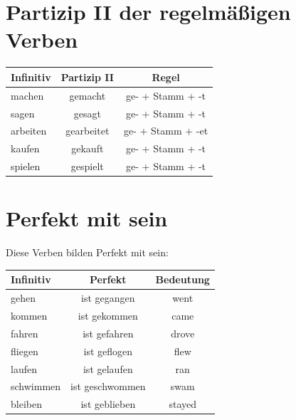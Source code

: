 \section{Partizip II der regelmäßigen Verben}

\begin{center}
\begin{tabular}{|l|c|c|}
\hline
Infinitiv & Partizip II & Regel \\ \hline
machen & gemacht & ge- + Stamm + -t \\ \hline
sagen & gesagt & ge- + Stamm + -t \\ \hline
arbeiten & gearbeitet & ge- + Stamm + -et \\ \hline
kaufen & gekauft & ge- + Stamm + -t \\ \hline
spielen & gespielt & ge- + Stamm + -t \\ \hline
\end{tabular}
\end{center}

\section{Perfekt mit sein}

Diese Verben bilden Perfekt mit sein:

\begin{center}
\begin{tabular}{|l|c|c|}
\hline
Infinitiv & Perfekt & Bedeutung \\ \hline
gehen & ist gegangen & went \\ \hline
kommen & ist gekommen & came \\ \hline
fahren & ist gefahren & drove \\ \hline
fliegen & ist geflogen & flew \\ \hline
laufen & ist gelaufen & ran \\ \hline
schwimmen & ist geschwommen & swam \\ \hline
bleiben & ist geblieben & stayed \\ \hline
\end{tabular}
\end{center}

\chapterend